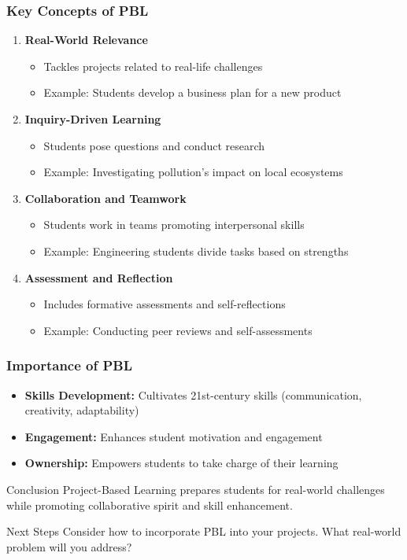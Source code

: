 \documentclass[aspectratio=169]{beamer}
\begin{document}
\begin{frame}[fragile]
    \frametitle{Key Concepts of PBL}
    \begin{enumerate}
        \item \textbf{Real-World Relevance}
            \begin{itemize}
                \item Tackles projects related to real-life challenges
                \item Example: Students develop a business plan for a new product
            \end{itemize}
        \item \textbf{Inquiry-Driven Learning}
            \begin{itemize}
                \item Students pose questions and conduct research
                \item Example: Investigating pollution's impact on local ecosystems
            \end{itemize}
        \item \textbf{Collaboration and Teamwork}
            \begin{itemize}
                \item Students work in teams promoting interpersonal skills
                \item Example: Engineering students divide tasks based on strengths
            \end{itemize}
        \item \textbf{Assessment and Reflection}
            \begin{itemize}
                \item Includes formative assessments and self-reflections
                \item Example: Conducting peer reviews and self-assessments
            \end{itemize}
    \end{enumerate}
\end{frame}

\begin{frame}[fragile]
    \frametitle{Importance of PBL}
    \begin{itemize}
        \item \textbf{Skills Development:} Cultivates 21st-century skills (communication, creativity, adaptability)
        \item \textbf{Engagement:} Enhances student motivation and engagement
        \item \textbf{Ownership:} Empowers students to take charge of their learning
    \end{itemize}
    \begin{block}{Conclusion}
        Project-Based Learning prepares students for real-world challenges while promoting collaborative spirit and skill enhancement.
    \end{block}
    \begin{block}{Next Steps}
        Consider how to incorporate PBL into your projects. What real-world problem will you address?
    \end{block}
\end{frame}
\end{document}
